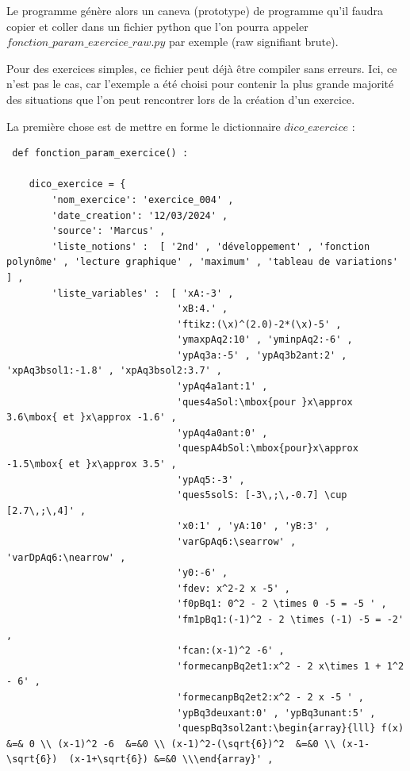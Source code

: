 {Le programme génère alors un caneva (prototype) de programme qu'il faudra copier et coller dans un fichier python que l'on pourra appeler
{\bf $fonction\_param\_exercice\_raw.py$} par exemple (raw signifiant brute).

Pour des exercices simples, ce fichier peut déjà être compiler sans erreurs. Ici, ce n'est pas le cas, car l'exemple a été choisi pour contenir la plus grande 
majorité des situations que l'on peut rencontrer lors de la création d'un exercice. 

La première chose est de mettre en forme le dictionnaire {\bf  $dico\_exercice$} :
\begin{verbatim}
 def fonction_param_exercice() : 

    dico_exercice = {
        'nom_exercice': 'exercice_004' ,
        'date_creation': '12/03/2024' ,
        'source': 'Marcus' ,
        'liste_notions' :  [ '2nd' , 'développement' , 'fonction polynôme' , 'lecture graphique' , 'maximum' , 'tableau de variations' ] , 
        'liste_variables' :  [ 'xA:-3' , 
                              'xB:4.' , 
                              'ftikz:(\x)^(2.0)-2*(\x)-5' , 
                              'ymaxpAq2:10' , 'yminpAq2:-6' , 
                              'ypAq3a:-5' , 'ypAq3b2ant:2' , 'xpAq3bsol1:-1.8' , 'xpAq3bsol2:3.7' ,
                              'ypAq4a1ant:1' , 
                              'ques4aSol:\mbox{pour }x\approx 3.6\mbox{ et }x\approx -1.6' , 
                              'ypAq4a0ant:0' , 
                              'quespA4bSol:\mbox{pour}x\approx -1.5\mbox{ et }x\approx 3.5' , 
                              'ypAq5:-3' , 
                              'ques5solS: [-3\,;\,-0.7] \cup  [2.7\,;\,4]' , 
                              'x0:1' , 'yA:10' , 'yB:3' , 
                              'varGpAq6:\searrow' , 'varDpAq6:\nearrow' , 
                              'y0:-6' , 
                              'fdev: x^2-2 x -5' , 
                              'f0pBq1: 0^2 - 2 \times 0 -5 = -5 ' , 
                              'fm1pBq1:(-1)^2 - 2 \times (-1) -5 = -2' , 
                              'fcan:(x-1)^2 -6' , 
                              'formecanpBq2et1:x^2 - 2 x\times 1 + 1^2 - 6' , 
                              'formecanpBq2et2:x^2 - 2 x -5 ' , 
                              'ypBq3deuxant:0' , 'ypBq3unant:5' , 
                              'quespBq3sol2ant:\begin{array}{lll} f(x) &=& 0 \\ (x-1)^2 -6  &=&0 \\ (x-1)^2-(\sqrt{6})^2  &=&0 \\ (x-1-\sqrt{6})  (x-1+\sqrt{6}) &=&0 \\\end{array}' , 

\end{verbatim}}
